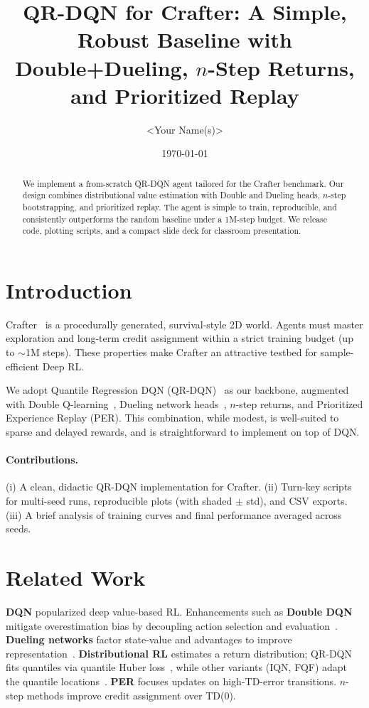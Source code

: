 \documentclass[11pt]{article}
\title{QR-DQN for Crafter: A Simple, Robust Baseline with Double+Dueling, $n$-Step Returns, and Prioritized Replay}
\author{<Your Name(s)>}
\date{\today}
\begin{document}
\maketitle

\begin{abstract}
We implement a from-scratch QR-DQN agent tailored for the Crafter benchmark. Our design combines distributional value estimation with Double and Dueling heads, $n$-step bootstrapping, and prioritized replay. The agent is simple to train, reproducible, and consistently outperforms the random baseline under a 1M-step budget. We release code, plotting scripts, and a compact slide deck for classroom presentation.
\end{abstract}

\section{Introduction}
Crafter~\cite{hafner2021crafter} is a procedurally generated, survival-style 2D world. Agents must master exploration and long-term credit assignment within a strict training budget (up to $\sim$1M steps). These properties make Crafter an attractive testbed for sample-efficient Deep RL.

We adopt Quantile Regression DQN (QR-DQN)~\cite{dabney2018qr} as our backbone, augmented with Double Q-learning~\cite{hasselt2016double}, Dueling network heads~\cite{wang2016dueling}, $n$-step returns, and Prioritized Experience Replay (PER). This combination, while modest, is well-suited to sparse and delayed rewards, and is straightforward to implement on top of DQN.

\paragraph{Contributions.} (i) A clean, didactic QR-DQN implementation for Crafter. (ii) Turn-key scripts for multi-seed runs, reproducible plots (with shaded $\pm$ std), and CSV exports. (iii) A brief analysis of training curves and final performance averaged across seeds.

\section{Related Work}
\textbf{DQN} popularized deep value-based RL. Enhancements such as \textbf{Double DQN} mitigate overestimation bias by decoupling action selection and evaluation~\cite{hasselt2016double}. \textbf{Dueling networks} factor state-value and advantages to improve representation~\cite{wang2016dueling}. \textbf{Distributional RL} estimates a return distribution; QR-DQN fits quantiles via quantile Huber loss~\cite{dabney2018qr}, while other variants (IQN, FQF) adapt the quantile locations~\cite{dabney2018iqn, yang2019fqf}. \textbf{PER} focuses updates on high-TD-error transitions. $n$-step methods improve credit assignment over TD(0).
\end{document}
